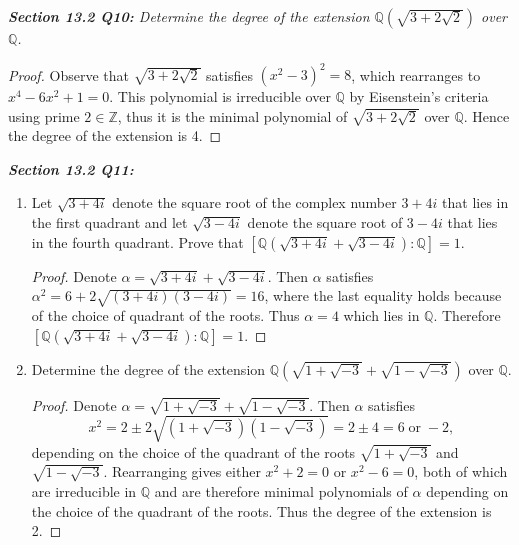 \documentclass{article}
\begin{document}
\it \textbf{Section 13.2 Q10:} Determine the degree of the extension
  $\mathbb{Q}(\sqrt{3+2\sqrt{2}})$ over $\mathbb{Q}$.

  \begin{proof}
    Observe that $\sqrt{3+2\sqrt{2}}$ satisfies $(x^2-3)^2=8$, which
    rearranges to $x^4-6x^2+1=0$. This polynomial is irreducible over
    $\mathbb{Q}$ by Eisenstein's criteria using prime $2\in\mathbb{Z}$,
    thus it is the minimal polynomial of $\sqrt{3+2\sqrt{2}}$ over
    $\mathbb{Q}$. Hence the degree of the extension is 4.
  \end{proof}

\it \textbf{Section 13.2 Q11:}
  \begin{enumerate}[label={(\alph*)}]
    \item Let $\sqrt{3+4i}$ denote the square root of the complex number
      $3+4i$ that lies in the first quadrant and let $\sqrt{3-4i}$ denote
      the square root of $3-4i$ that lies in the fourth quadrant. Prove
      that $[\mathbb{Q}(\sqrt{3+4i}+\sqrt{3-4i}):\mathbb{Q}]=1$.

      \begin{proof}
        Denote $\alpha=\sqrt{3+4i}+\sqrt{3-4i}$. Then $\alpha$ satisfies
        $\alpha^2=6+2\sqrt{(3+4i)(3-4i)}=16$, where the last equality holds
        because of the choice of quadrant of the roots. Thus $\alpha=4$
        which lies in $\mathbb{Q}$. Therefore
        $[\mathbb{Q}(\sqrt{3+4i}+\sqrt{3-4i}):\mathbb{Q}]=1$.
      \end{proof}

    \item Determine the degree of the extension
      $\mathbb{Q}(\sqrt{1+\sqrt{-3}} +\sqrt{1-\sqrt{-3}})$ over
      $\mathbb{Q}$.

      \begin{proof}
        Denote $\alpha=\sqrt{1+\sqrt{-3}} +\sqrt{1-\sqrt{-3}}$. Then
        $\alpha$ satisfies
        \[x^2 =2\pm 2\sqrt{(1+\sqrt{-3})(1-\sqrt{-3})} =2\pm 4 =6\;
        \text{or}\; -2,\]
        depending on the choice of the quadrant of the roots
        $\sqrt{1+\sqrt{-3}}$ and $\sqrt{1-\sqrt{-3}}$. Rearranging gives
        either $x^2+2=0$ or $x^2-6=0$, both of which are irreducible in
        $\mathbb{Q}$ and are therefore minimal polynomials of $\alpha$
        depending on the choice of the quadrant of the roots. Thus the
        degree of the extension is 2.
      \end{proof}
  \end{enumerate}
\end{document}
